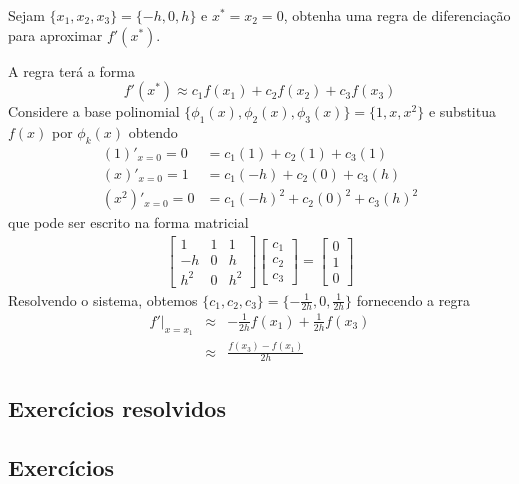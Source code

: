 \begin{ex}
Sejam $\{x_1, x_2, x_3\}=\{-h, 0, h\}$ e $x^*=x_2=0$, obtenha uma regra de diferenciação para aproximar $f'(x^*)$.
\end{ex}
\begin{sol}
A regra terá a forma
\begin{equation}
  f'(x^*) \approx c_1f(x_1)+c_2f(x_2)+c_3f(x_3)
\end{equation}
Considere a base polinomial $\{\phi _1(x), \phi _2(x), \phi _3(x)\} = \{1, x, x^2\}$ e substitua $f(x)$ por $\phi _k(x)$ obtendo
\begin{eqnarray}
    (1)'_{x=0} = 0  &=  c_1(1)   +c_2(1)  + c_3 (1) \\
    (x)'_{x=0} = 1  &=  c_1(-h)  +c_2(0)  + c_3 (h)\\
  (x^2)'_{x=0} = 0  &=  c_1(-h)^2+c_2(0)^2+ c_3 (h)^2
\end{eqnarray}
que pode ser escrito na forma matricial
\begin{eqnarray}
  \begin{bmatrix}
    1   &  1    & 1  \\
    -h  &  0    & h  \\
    h^2 &  0    & h^2    
  \end{bmatrix}
  \begin{bmatrix}
    c_1 \\ c_2\\ c_3
  \end{bmatrix}
=
\begin{bmatrix}
  0  \\ 1 \\ 0
\end{bmatrix}
\end{eqnarray}
Resolvendo o sistema, obtemos $\{c_1, c_2, c_3\}=\{-\frac{1}{2h}, 0, \frac{1}{2h}\}$ fornecendo a regra
\begin{eqnarray}
  f'|_{x=x_1}& \approx &  -\frac{1}{2h}f(x_1) + \frac{1}{2h}f(x_3)\\
             & \approx &\frac{f(x_3)-f(x_1)}{2h}
\end{eqnarray}
\end{sol}

\subsection*{Exercícios resolvidos}

\emconstrucao

\subsection*{Exercícios}


